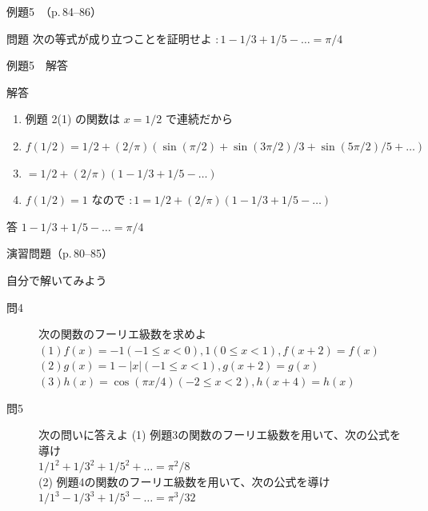 \documentclass[aspectratio=43,professionalfonts,handout]{beamer}
\begin{document}
\begin{frame}{例題5　（p.\,84--86）}
  \begin{exampleblock}{問題}
    次の等式が成り立つことを証明せよ $: 1 - 1/3 + 1/5 - \ldots = \pi/4$\\[2pt]
  \end{exampleblock}
\end{frame}

\begin{frame}{例題5　解答}
  \begin{exampleblock}{解答}
  \begin{enumerate}[1.]
    \item[] 例題 2(1) の関数は $x = 1/2$ で連続だから
    \item[] $f(1/2) = 1/2 + (2/\pi)(\sin(\pi/2) + \sin(3\pi/2)/3 + \sin(5\pi/2)/5 + \ldots)$
    \item[] $= 1/2 + (2/\pi)(1 - 1/3 + 1/5 - \ldots)$
    \item[] $f(1/2) = 1$ なので $: 1 = 1/2 + (2/\pi)(1 - 1/3 + 1/5 - \ldots)$
  \end{enumerate}
  \end{exampleblock}
  \begin{alertblock}{答}
    $1 - 1/3 + 1/5 - \ldots = \pi/4$
  \end{alertblock}
\end{frame}

\begin{frame}{演習問題（p.\,80--85）}
  \begin{exampleblock}{自分で解いてみよう}
  \begin{description}
    \item[問4] 次の関数のフーリエ級数を求めよ
    $(1) f(x) = { -1  (-1 \leq x < 0),  1  (0 \leq x < 1) },  f(x+2) = f(x)$\\
    $(2) g(x) = 1 - |x|  (-1 \leq x < 1),  g(x+2) = g(x)$\\
    $(3) h(x) = \cos(\pi x/4)  (-2 \leq x < 2),  h(x+4) = h(x)$\\
    \item[問5] 次の問いに答えよ
    (1) 例題3の関数のフーリエ級数を用いて、次の公式を導け\\
    $1/1^{2} + 1/3^{2} + 1/5^{2} + \ldots = \pi^{2}/8$\\
    (2) 例題4の関数のフーリエ級数を用いて、次の公式を導け\\
    $1/1^{3} - 1/3^{3} + 1/5^{3} - \ldots = \pi^{3}/32$\\
  \end{description}
  \end{exampleblock}
\end{frame}
\end{document}
